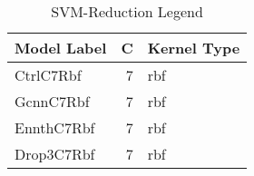 \begin{table}
\centering
\caption{SVM-Reduction Legend}
\label{tab:SVM-Reduction_legend}
\begin{tabular}{lrl}
\toprule
Model Label & C & Kernel Type \\
\midrule
CtrlC7Rbf & 7 & rbf \\
GcnnC7Rbf & 7 & rbf \\
EnnthC7Rbf & 7 & rbf \\
Drop3C7Rbf & 7 & rbf \\
\bottomrule
\end{tabular}
\end{table}

